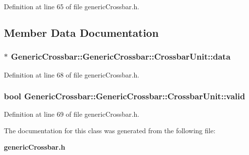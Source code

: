 Definition at line 65 of file genericCrossbar.h.

\subsection{Member Data Documentation}
\subsubsection[{data}]{$\ast$ {\bf GenericCrossbar::GenericCrossbar::CrossbarUnit::data}}\label{classGenericCrossbar_1_1CrossbarUnit_14558670755f9674e22592dd0d2ddd05}




Definition at line 68 of file genericCrossbar.h.
\subsubsection[{valid}]{\setlength{\rightskip}{0pt plus 5cm}bool GenericCrossbar::GenericCrossbar::CrossbarUnit::valid}\label{classGenericCrossbar_1_1CrossbarUnit_46d03ff28869471ba9db56ca6acb3668}




Definition at line 69 of file genericCrossbar.h.

The documentation for this class was generated from the following file:\begin{CompactItemize}
\item 
{\bf genericCrossbar.h}\end{CompactItemize}
